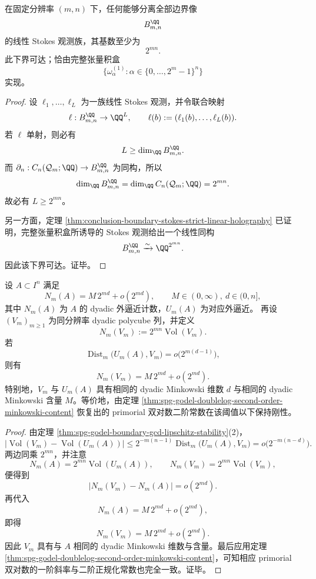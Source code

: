 \begin{theorem}\label{thm:conclusion-boundary-stokes-observation-minimal-dimension}
在固定分辨率 \((m,n)\) 下，任何能够分离全部边界像
\[
B_{m,n}^{\QQ}
\]
的线性 Stokes 观测族，其基数至少为
\[
2^{mn}.
\]
此下界可达；恰由完整张量积盒
\[
\{\omega^{(1)}_{\alpha}:\alpha\in\{0,\dots,2^m-1\}^n\}
\]
实现。
\end{theorem}

\begin{proof}
设 \(\ell_1,\dots,\ell_L\) 为一族线性 Stokes 观测，并令联合映射
\[
\ell:B_{m,n}^{\QQ}\to \QQ^L,
\qquad
\ell(b):=(\ell_1(b),\dots,\ell_L(b)).
\]
若 \(\ell\) 单射，则必有
\[
L\ge \dim_{\QQ} B_{m,n}^{\QQ}.
\]
而 \(\partial_n:C_n(\mathcal Q_m;\QQ)\to B_{m,n}^{\QQ}\) 为同构，所以
\[
\dim_{\QQ} B_{m,n}^{\QQ}
=
\dim_{\QQ} C_n(\mathcal Q_m;\QQ)
=
2^{mn}.
\]
故必有 \(L\ge 2^{mn}\)。

另一方面，定理 \ref{thm:conclusion-boundary-stokes-strict-linear-holography} 已证明，完整张量积盒所诱导的 Stokes 观测给出一个线性同构
\[
B_{m,n}^{\QQ}\xrightarrow{\sim}\QQ^{2^{mn}}.
\]
因此该下界可达。证毕。
\end{proof}

\begin{theorem}\label{thm:conclusion-boundary-subcritical-perturbation-second-order-rigidity}
设 \(A\subset I^n\) 满足
\[
N_m(A)=M\,2^{md}+o(2^{md}),
\qquad
M\in(0,\infty),\ d\in(0,n],
\]
其中 \(N_m(A)\) 为 \(A\) 的 dyadic 外逼近计数，\(U_m(A)\) 为对应外逼近。
再设 \((V_m)_{m\ge 1}\) 为同分辨率 dyadic polycube 列，并定义
\[
N_m(V_m):=2^{mn}\operatorname{Vol}(V_m).
\]
若
\[
\operatorname{Dist}_m\bigl(U_m(A),V_m\bigr)=o\!\bigl(2^{m(d-1)}\bigr),
\]
则有
\[
N_m(V_m)=M\,2^{md}+o(2^{md}).
\]
特别地，\(V_m\) 与 \(U_m(A)\) 具有相同的 dyadic Minkowski 维数 \(d\) 与相同的 dyadic Minkowski 含量 \(M\)。等价地，由定理 \ref{thm:spg-godel-doublelog-second-order-minkowski-content} 恢复出的 primorial 双对数二阶常数在该阈值以下保持刚性。
\end{theorem}
\begin{proof}
由定理 \ref{thm:spg-godel-boundary-gcd-lipschitz-stability}(2)，
\[
\bigl|\operatorname{Vol}(V_m)-\operatorname{Vol}(U_m(A))\bigr|
\le
2^{-m(n-1)}\operatorname{Dist}_m\bigl(U_m(A),V_m\bigr)
=
o\!\bigl(2^{-m(n-d)}\bigr).
\]
两边同乘 \(2^{mn}\)，并注意
\[
N_m(A)=2^{mn}\operatorname{Vol}(U_m(A)),
\qquad
N_m(V_m)=2^{mn}\operatorname{Vol}(V_m),
\]
便得到
\[
|N_m(V_m)-N_m(A)|=o(2^{md}).
\]
再代入
\[
N_m(A)=M\,2^{md}+o(2^{md}),
\]
即得
\[
N_m(V_m)=M\,2^{md}+o(2^{md}).
\]
因此 \(V_m\) 具有与 \(A\) 相同的 dyadic Minkowski 维数与含量。最后应用定理 \ref{thm:spg-godel-doublelog-second-order-minkowski-content}，可知相应 primorial 双对数的一阶斜率与二阶正规化常数也完全一致。证毕。
\end{proof}

